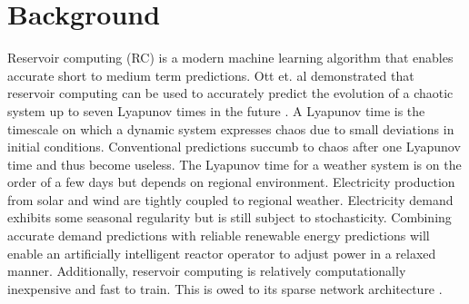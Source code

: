 \section{Background}

Reservoir computing (RC) is a modern machine learning algorithm that enables
accurate short
to medium term predictions. Ott et. al demonstrated that reservoir computing
can be used to accurately predict the evolution of a chaotic system up to seven
Lyapunov times in the
future \cite{pathak_model-free_2018, wikner_combining_2020}. A Lyapunov time is
the timescale on which a dynamic system expresses chaos
due to small deviations in initial conditions. Conventional predictions succumb
to chaos after one
Lyapunov time and thus become useless. The Lyapunov time for a
weather system is on the order of a few days but depends on regional
environment.
Electricity production from solar and wind are tightly coupled to regional
weather. Electricity demand exhibits some seasonal regularity but is still
subject to stochasticity. Combining accurate demand predictions with reliable
renewable energy predictions will enable an artificially intelligent reactor
operator to adjust power in a relaxed manner. Additionally, reservoir computing
is relatively computationally inexpensive and fast to train. This is owed to its
sparse network architecture \cite{pathak_model-free_2018,
wikner_combining_2020, vannitsem_predictability_2017}.
